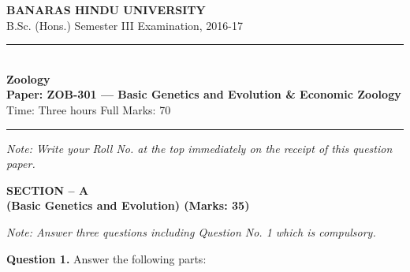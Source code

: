 \documentclass[11pt,a4paper]{article}
\begin{document}
\begin{center}
  {\large\bfseries BANARAS HINDU UNIVERSITY}\\[2pt]
  {\normalsize B.Sc. (Hons.) Semester III Examination, 2016-17}\\[6pt]
  \rule{0.8\linewidth}{0.5pt}\\[6pt]
  {\large\bfseries Zoology}\\[4pt]
  {\large\bfseries Paper: ZOB-301 --- Basic Genetics and Evolution \& Economic Zoology}\\[4pt]
  {\normalsize Time: Three hours \hfill Full Marks: 70}
\end{center}

\rule{\linewidth}{0.4pt}

\smallskip



\noindent   \textit{Note: Write your Roll No. at the top immediately on the receipt of this question paper.}

\bigskip

\begin{center}
   \textbf{SECTION -- A} \\
   \textbf{(Basic Genetics and Evolution) (Marks: 35)}
\end{center}

\smallskip



\noindent   \textit{Note: Answer three questions including Question No. 1 which is compulsory.}

\bigskip



\noindent   \textbf{Question 1.} Answer the following parts:
\end{document}
